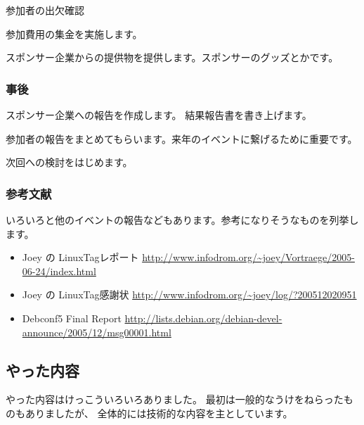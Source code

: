 \documentclass[mingoth,a4paper]{jsarticle}
\begin{document}
参加者の出欠確認

参加費用の集金を実施します。

スポンサー企業からの提供物を提供します。スポンサーのグッズとかです。

\subsubsection{事後}

スポンサー企業への報告を作成します。
結果報告書を書き上げます。

参加者の報告をまとめてもらいます。来年のイベントに繋げるために重要です。

次回への検討をはじめます。

\subsubsection{参考文献}

いろいろと他のイベントの報告などもあります。参考になりそうなものを列挙し
ます。

\begin{itemize}
 \item
      Joey の LinuxTagレポート
      \url{http://www.infodrom.org/~joey/Vortraege/2005-06-24/index.html}
 \item
      Joey の LinuxTag感謝状
      \url{http://www.infodrom.org/~joey/log/?200512020951}
 \item
      Debconf5 Final Report
      \url{http://lists.debian.org/debian-devel-announce/2005/12/msg00001.html}
      
\end{itemize}

\subsection{やった内容}

やった内容はけっこういろいろありました。
最初は一般的なうけをねらったものもありましたが、
全体的には技術的な内容を主としています。
\end{document}
